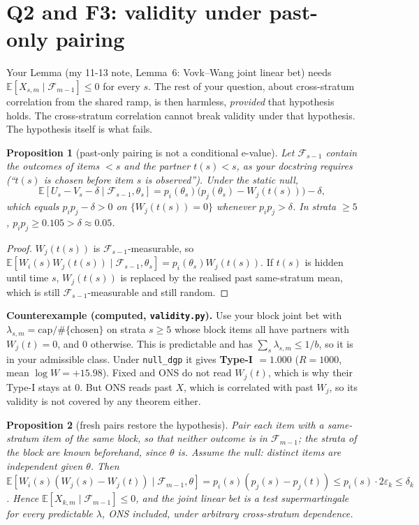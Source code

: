 \documentclass[11pt]{article}
\newtheorem{proposition}{Proposition}
\newcommand{\E}{\mathbb{E}}
\newcommand{\Fc}{\mathcal{F}}
\begin{document}
\section{Q2 and F3: validity under past-only pairing}
Your Lemma (my 11-13 note, Lemma~6: Vovk--Wang joint linear bet) needs $\E[X_{s,m}\mid\Fc_{m-1}]\le0$ for every $s$. The rest of your question, about cross-stratum correlation from the shared ramp, is then harmless, \emph{provided} that hypothesis holds. The cross-stratum correlation cannot break validity under that hypothesis. The hypothesis itself is what fails.
\begin{proposition}[past-only pairing is not a conditional e-value]\label{prop:fail}
Let $\Fc_{s-1}$ contain the outcomes of items $<s$ and the partner $t(s)<s$, as your docstring requires (``$t(s)$ is chosen before item $s$ is observed''). Under the static null,
\[\E[U_s-V_s-\delta\mid\Fc_{s-1},\theta_s]=p_i(\theta_s)\big(p_j(\theta_s)-W_j(t(s))\big)-\delta,\]
which equals $p_ip_j-\delta>0$ on $\{W_j(t(s))=0\}$ whenever $p_ip_j>\delta$. In strata $\ge5$, $p_ip_j\ge0.105>\delta\approx0.05$.
\end{proposition}
\begin{proof}
$W_j(t(s))$ is $\Fc_{s-1}$-measurable, so $\E[W_i(s)W_j(t(s))\mid\Fc_{s-1},\theta_s]=p_i(\theta_s)W_j(t(s))$. If $t(s)$ is hidden until time $s$, $W_j(t(s))$ is replaced by the realised past same-stratum mean, which is still $\Fc_{s-1}$-measurable and still random.
\end{proof}
\textbf{Counterexample (computed, \texttt{validity.py}).} Use your block joint bet with $\lambda_{s,m}=\mathrm{cap}/\#\{\text{chosen}\}$ on strata $s\ge5$ whose block items all have partners with $W_j(t)=0$, and $0$ otherwise. This is predictable and has $\sum_s\lambda_{s,m}\le1/b$, so it is in your admissible class. Under \texttt{null\_dgp} it gives \textbf{Type-I $=1.000$} ($R=1000$, mean $\log W=+15.98$).
Fixed and ONS do not read $W_j(t)$, which is why their Type-I stays at $0$. But ONS reads past $X$, which is correlated with past $W_j$, so its validity is not covered by any theorem either.
\begin{proposition}[fresh pairs restore the hypothesis]\label{prop:fresh}
Pair each item with a same-stratum item of the \emph{same block}, so that neither outcome is in $\Fc_{m-1}$; the strata of the block are known beforehand, since $\theta$ is. Assume the null: distinct items are independent given $\theta$. Then $\E[W_i(s)(W_j(s)-W_j(t))\mid\Fc_{m-1},\theta]=p_i(s)(p_j(s)-p_j(t))\le p_i(s)\cdot2\varepsilon_{k}\le\delta_k$. Hence $\E[X_{k,m}\mid\Fc_{m-1}]\le0$, and the joint linear bet is a test supermartingale for \emph{every} predictable $\lambda$, ONS included, under arbitrary cross-stratum dependence.
\end{proposition}
\end{document}
